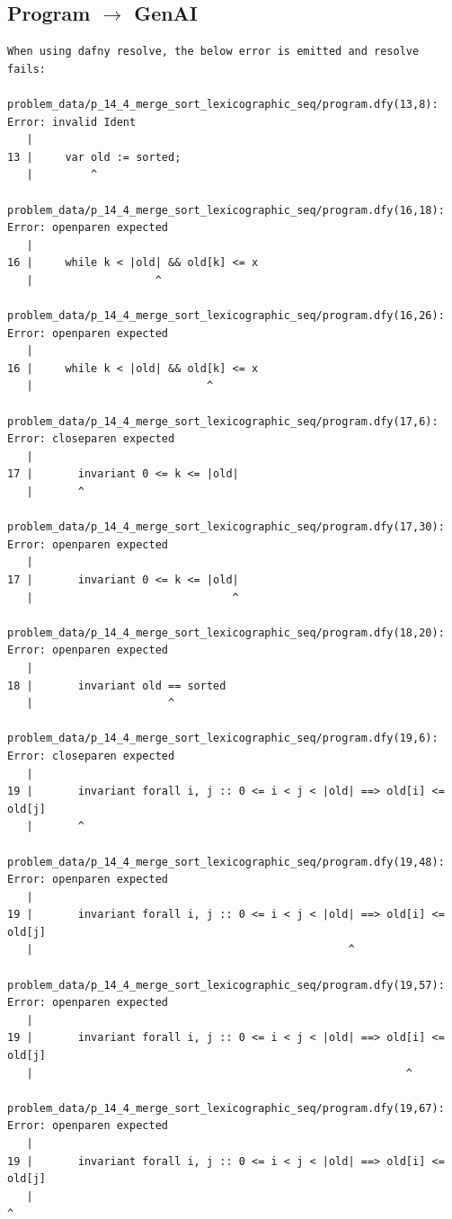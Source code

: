 \documentclass{article}
\begin{document}
\subsection*{Program $\rightarrow$ GenAI}
\begin{lstlisting}
When using dafny resolve, the below error is emitted and resolve fails:

problem_data/p_14_4_merge_sort_lexicographic_seq/program.dfy(13,8): Error: invalid Ident
   |
13 |     var old := sorted;
   |         ^

problem_data/p_14_4_merge_sort_lexicographic_seq/program.dfy(16,18): Error: openparen expected
   |
16 |     while k < |old| && old[k] <= x
   |                   ^

problem_data/p_14_4_merge_sort_lexicographic_seq/program.dfy(16,26): Error: openparen expected
   |
16 |     while k < |old| && old[k] <= x
   |                           ^

problem_data/p_14_4_merge_sort_lexicographic_seq/program.dfy(17,6): Error: closeparen expected
   |
17 |       invariant 0 <= k <= |old|
   |       ^

problem_data/p_14_4_merge_sort_lexicographic_seq/program.dfy(17,30): Error: openparen expected
   |
17 |       invariant 0 <= k <= |old|
   |                               ^

problem_data/p_14_4_merge_sort_lexicographic_seq/program.dfy(18,20): Error: openparen expected
   |
18 |       invariant old == sorted
   |                     ^

problem_data/p_14_4_merge_sort_lexicographic_seq/program.dfy(19,6): Error: closeparen expected
   |
19 |       invariant forall i, j :: 0 <= i < j < |old| ==> old[i] <= old[j]
   |       ^

problem_data/p_14_4_merge_sort_lexicographic_seq/program.dfy(19,48): Error: openparen expected
   |
19 |       invariant forall i, j :: 0 <= i < j < |old| ==> old[i] <= old[j]
   |                                                 ^

problem_data/p_14_4_merge_sort_lexicographic_seq/program.dfy(19,57): Error: openparen expected
   |
19 |       invariant forall i, j :: 0 <= i < j < |old| ==> old[i] <= old[j]
   |                                                          ^

problem_data/p_14_4_merge_sort_lexicographic_seq/program.dfy(19,67): Error: openparen expected
   |
19 |       invariant forall i, j :: 0 <= i < j < |old| ==> old[i] <= old[j]
   |                                                                    ^


\end{lstlisting}
\end{document}
